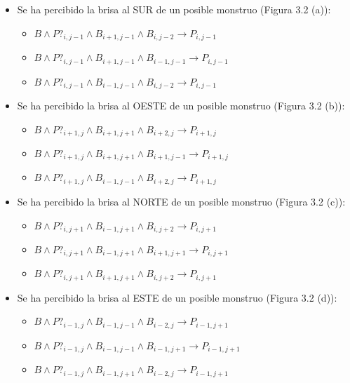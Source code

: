 \begin{itemize}
    \item Se ha percibido la brisa al SUR de un posible monstruo (Figura 3.2 (a)):
        \begin{itemize}
             \item $B \land P?_{i, j-1} \land B_{i+1, j-1} \land B_{i, j-2} \longrightarrow P_{i, j-1}$
             \item $B \land P?_{i, j-1} \land B_{i+1, j-1} \land B_{i-1, j-1} \longrightarrow P_{i, j-1}$
             \item $B \land P?_{i, j-1} \land B_{i-1, j-1} \land B_{i, j-2} \longrightarrow P_{i, j-1}$
        \end{itemize}
        
    \item Se ha percibido la brisa al OESTE de un posible monstruo (Figura 3.2 (b)):
        \begin{itemize}
            \item $B \land P?_{i+1, j} \land B_{i+1, j+1} \land B_{i+2, j} \longrightarrow P_{i+1, j}$
            \item $B \land P?_{i+1, j} \land B_{i+1, j+1} \land B_{i+1, j-1} \longrightarrow P_{i+1, j}$
            \item $B \land P?_{i+1, j} \land B_{i-1, j-1} \land B_{i+2, j} \longrightarrow P_{i+1, j}$
        \end{itemize}
        
    \item Se ha percibido la brisa al NORTE de un posible monstruo (Figura 3.2 (c)):
        \begin{itemize}
           \item $B \land P?_{i, j+1} \land B_{i-1, j+1} \land B_{i, j+2} \longrightarrow P_{i, j+1}$
            \item $B \land P?_{i, j+1} \land B_{i-1, j+1} \land B_{i+1, j+1} \longrightarrow P_{i, j+1}$
            \item $B \land P?_{i, j+1} \land B_{i+1, j+1} \land B_{i, j+2} \longrightarrow P_{i, j+1}$
        \end{itemize}
        
    \item Se ha percibido la brisa al ESTE de un posible monstruo (Figura 3.2 (d)):
        \begin{itemize}
            \item $B \land P?_{i-1, j} \land B_{i-1, j-1} \land B_{i-2, j} \longrightarrow P_{i-1, j+1}$
            \item $B \land P?_{i-1, j} \land B_{i-1, j-1} \land B_{i-1, j+1} \longrightarrow P_{i-1, j+1}$
            \item $B \land P?_{i-1, j} \land B_{i-1, j+1} \land B_{i-2, j} \longrightarrow P_{i-1, j+1}$
        \end{itemize}
\end{itemize}

